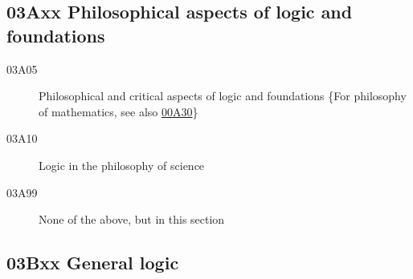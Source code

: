 \documentclass[letterpaper]{article}
\begin{document}
\subsection*{03Axx  Philosophical aspects of logic and foundations }\label{03Axx}
\begin{description} 
\item [03A05]\label{03A05} Philosophical and critical aspects of logic and foundations \{For philosophy of mathematics, see also \hyperref[00A30]{00A30}\}
\item [03A10]\label{03A10} Logic in the philosophy of science
\item [03A99]\label{03A99} None of the above, but in this section
\end{description}
\subsection*{03Bxx  General logic }\label{03Bxx}
\end{document}
